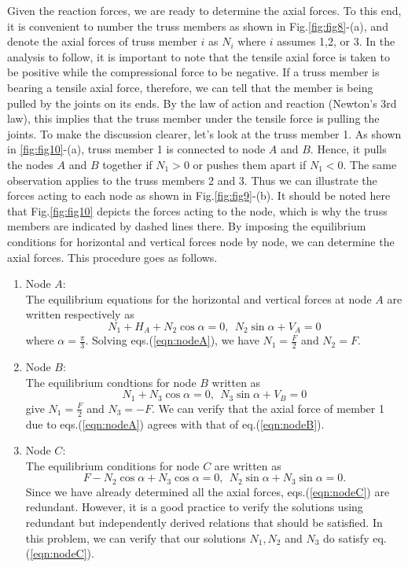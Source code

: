 ﻿\documentclass[10pt,a4j]{article}
\begin{document}
Given the reaction forces, we are ready to determine the axial forces. 
To this end, it is convenient to number the truss members as shown in Fig.\ref{fig:fig8}-(a), 
and denote the axial forces of truss member $i$ as $N_i$ where $i$ assumes 1,2, or 3. 
In the analysis to follow, it is important to note that the tensile axial force is taken to be positive while the compressional force to be negative. 
If a truss member is bearing a tensile axial force, therefore, we can tell that the member is being pulled by the joints on its ends. By the law of action and reaction (Newton's 3rd law), this implies that the truss member under the tensile force is pulling the joints. To make the discussion clearer, let's look at the truss member 1. As shown in \ref{fig:fig10}-(a), truss member 1 is connected to node $A$ and $B$. 
Hence, it pulls the nodes $A$ and $B$ together if $N_1>0$ or pushes them apart if $N_1<0$. 
The same observation applies to the truss members 2 and 3. 
Thus we can illustrate the forces acting to each node as shown in Fig.\ref{fig:fig9}-(b). 
It should be noted here that Fig.\ref{fig:fig10} depicts the forces acting to the node, which is why the truss members are indicated by dashed lines there. By imposing the equilibrium conditions for horizontal and vertical forces node by node, we can determine the axial forces. This procedure goes as follows.
\begin{enumerate}
\item
	Node $A$: \\
	The equilibrium equations for the horizontal and vertical forces at 
	node $A$ are written respectively as 
	\begin{equation}
		N_1+H_A+N_2\cos\alpha=0, \ \ N_2\sin\alpha+V_A=0
		\label{eqn:nodeA}
	\end{equation}
	where $\alpha=\frac{\pi}{3}$. Solving eqs.(\ref{eqn:nodeA}), 
	we have $N_1=\frac{F}{2}$ and $N_2=F$. 
\item
	Node $B$: \\
	The equilibrium condtions for node $B$ written as 
	\begin{equation}
		N_1+N_3\cos\alpha=0, \ \ N_3\sin\alpha+V_B=0
		\label{eqn:nodeB}
	\end{equation}
	give $N_1=\frac{F}{2}$ and $N_3=-F$. We can verify that the axial 
	force of member 1 due to eqs.(\ref{eqn:nodeA}) agrees with that of eq.(\ref{eqn:nodeB}).
\item
	Node $C$: \\
	The equilibrium conditions for node $C$ are written as 
	\begin{equation}
		F-N_2\cos\alpha+N_3\cos\alpha=0, \ \ N_2\sin\alpha+N_3\sin\alpha=0.
		\label{eqn:nodeC}
	\end{equation}
	Since we have already determined all the axial forces, eqs.(\ref{eqn:nodeC}) are redundant.  
	However, it is a good practice to verify the solutions using redundant 
	but independently derived relations that should be satisfied.  
	In this problem, we can verify that our solutions $N_1,N_2$ and $N_3$ do 
	satisfy eq.(\ref{eqn:nodeC}).
\end{enumerate}
\end{document}
